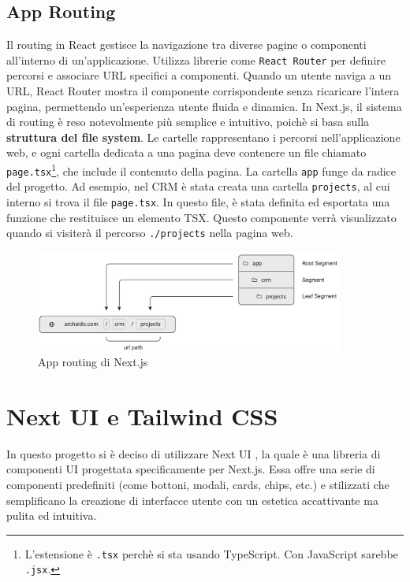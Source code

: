 \documentclass[target=bach,aauheader=,style=]{thud}
\begin{document}
\subsection{App Routing}
Il routing in React gestisce la navigazione tra diverse pagine o componenti all'interno di un'applicazione. Utilizza librerie come \texttt{React Router} per definire percorsi e associare URL specifici a componenti. Quando un utente naviga a un URL, React Router mostra il componente corrispondente senza ricaricare l'intera pagina, permettendo un'esperienza utente fluida e dinamica. In Next.js, il sistema di routing è reso notevolmente più semplice e intuitivo, poichè si basa sulla \textbf{struttura del file system}. Le cartelle rappresentano i percorsi nell'applicazione web, e ogni cartella dedicata a una pagina deve contenere un file chiamato \texttt{page.tsx}\footnote{L'estensione è \texttt{.tsx} perchè si sta usando TypeScript. Con JavaScript sarebbe \texttt{.jsx}.}, che include il contenuto della pagina. La cartella \texttt{app} funge da radice del progetto. Ad esempio, nel CRM è stata creata una cartella \texttt{projects}, al cui interno si trova il file \texttt{page.tsx}. In questo file, è stata definita ed esportata una funzione che restituisce un elemento TSX. Questo componente verrà visualizzato quando si visiterà il percorso \texttt{./projects} nella pagina web.

\begin{figure}[htbp]
    \centering
    \includegraphics[width=0.9\textwidth]{img/routing.pdf} 
    \caption{App routing \cite{nextjsdocs2024} di Next.js}
\end{figure}



\section{Next UI e Tailwind CSS}
In questo progetto si è deciso di utilizzare Next UI \cite{nextui2024}, la quale è una libreria di componenti UI progettata specificamente per Next.js. Essa offre una serie di componenti predefiniti (come bottoni, modali, cards, chips, etc.) e stilizzati che semplificano la creazione di interfacce utente con un estetica accattivante ma pulita ed intuitiva. 
\end{document}
